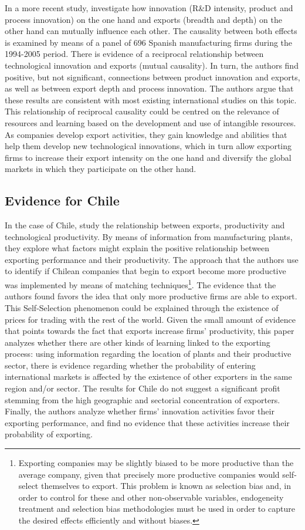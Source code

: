 In a more recent study, \cite{Filipescu2013} investigate how innovation (R\&D intensity, product and process innovation) on the one hand and exports (breadth and depth) on the other hand can mutually influence each other. The causality between both effects is examined by means of a panel of 696 Spanish manufacturing firms during the 1994-2005 period. There is evidence of a reciprocal relationship between technological innovation and exports (mutual causality). In turn, the authors find positive, but not significant, connections between product innovation and exports, as well as between export depth and process innovation. The authors argue that these results are consistent with most existing international studies on this topic. This relationship of reciprocal causality could be centred on the relevance of resources and learning based on the development and use of intangible resources. As companies develop export activities, they gain knowledge and abilities that help them develop new technological innovations, which in turn allow exporting firms to increase their export intensity on the one hand and diversify the global markets in which they participate on the other hand.

\subsection{Evidence for Chile}
In the case of Chile, \citep{AlvarezAgo2008} study the relationship between exports, productivity and technological productivity. By means of information from manufacturing plants, they explore what factors might explain the positive relationship between exporting performance and their productivity. The approach that the authors use to identify if Chilean companies that begin to export become more productive was implemented by means of matching techniques\footnote{Exporting companies may be slightly biased to be more productive than the average company, given that precisely more productive companies would self-select themselves to export. This problem is known as selection bias and, in order to control for these and other non-observable variables, endogeneity treatment and selection bias methodologies must be used in order to capture the desired effects efficiently and without biases.}. The evidence that the authors found favors the idea that only more productive firms are able to export. This Self-Selection phenomenon could be explained through the existence of prices for trading with the rest of the world. Given the small amount of evidence that points towards the fact that exports increase firms' productivity, this paper analyzes whether there are other kinds of learning linked to the exporting process: using information regarding the location of plants and their productive sector, there is evidence regarding whether the probability of entering international markets is affected by the existence of other exporters in the same region and/or sector. The results for Chile do not suggest a significant profit stemming from the high geographic and sectorial concentration of exporters. Finally, the authors analyze whether firms' innovation activities favor their exporting performance, and find no evidence that these activities increase their probability of exporting.

